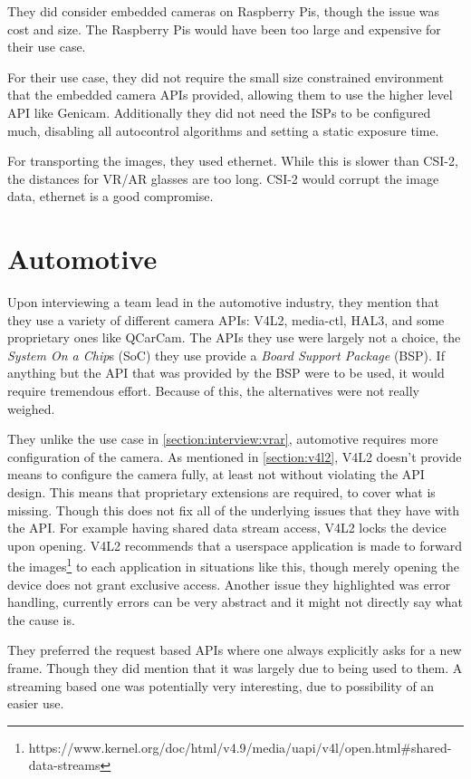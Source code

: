 They did consider embedded cameras on Raspberry Pis, though the issue was cost
and size. The Raspberry Pis would have been too large and expensive for their
use case.

For their use case, they did not require the small size constrained environment
that the embedded camera APIs provided, allowing them to use the higher level
API like Genicam. Additionally they did not need the ISPs to be configured
much, disabling all autocontrol algorithms and setting a static exposure time.

For transporting the images, they used ethernet. While this is slower than
CSI-2, the distances for VR/AR glasses are too long. CSI-2 would corrupt the
image data, ethernet is a good compromise.

\section{Automotive}
Upon interviewing a team lead in the automotive industry, they mention that
they use a variety of different camera APIs: V4L2, media-ctl, HAL3, and some
proprietary ones like QCarCam. The APIs they use were largely not a choice, the
\textit{System On a Chip}s (SoC) they use provide a \textit{Board Support Package} (BSP).
If anything but the API that was provided by the BSP were to be used, it would
require tremendous effort. Because of this, the alternatives were not really
weighed.

They unlike the use case in \cref{section:interview:vrar}, automotive requires
more configuration of the camera. As mentioned in \cref{section:v4l2}, V4L2
doesn't provide means to configure the camera fully, at least not without
violating the API design. This means that proprietary extensions are required,
to cover what is missing. Though this does not fix all of the underlying issues
that they have with the API. For example having shared data stream access, V4L2
locks the device upon opening. V4L2 recommends that a userspace application is
made to forward the images\footnote{https://www.kernel.org/doc/html/v4.9/media/uapi/v4l/open.html\#shared-data-streams}
to each application in situations like this, though merely opening the device
does not grant exclusive access. Another issue they highlighted was error handling,
currently errors can be very abstract and it might not directly say what the
cause is.

They preferred the request based APIs where one always explicitly asks for a
new frame. Though they did mention that it was largely due to being used to
them. A streaming based one was potentially very interesting, due to possibility
of an easier use.

